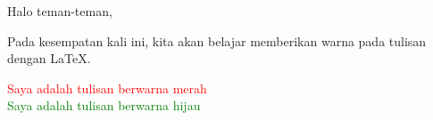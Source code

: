 \documentclass[12pt, times new roman]{article}
\begin{document}
Halo teman-teman,

Pada kesempatan kali ini, kita akan belajar memberikan warna pada tulisan dengan LaTeX.

\indent \textcolor{red}{Saya adalah tulisan berwarna merah}\\
\indent \textcolor{green}{Saya adalah tulisan berwarna hijau}
\end{document}
